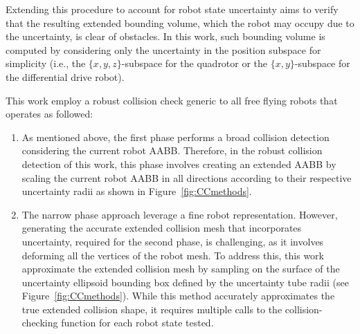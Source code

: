 Extending this procedure to account for robot state uncertainty aims to verify that the resulting extended bounding volume, which the robot may occupy due to the uncertainty, is clear of obstacles.
In this work, such bounding volume is computed by considering only the uncertainty in the position subspace for simplicity (i.e., the $\{x,y,z\}$-subspace for the quadrotor or the $\{x,y\}$-subspace for the differential drive robot).

This work employ a robust collision check generic to all free flying robots that operates as followed:
\begin{enumerate}
    \item As mentioned above, the first phase performs a broad collision detection considering the current robot AABB. 
    Therefore, in the robust collision detection of this work, this phase involves creating an extended AABB by scaling the current robot AABB in all directions according to their respective uncertainty radii as shown in Figure~\ref{fig:CCmethods}. 
    \item The narrow phase approach leverage a fine robot representation.
    However, generating the accurate extended collision mesh that incorporates uncertainty, required for the second phase, is challenging, as it involves deforming all the vertices of the robot mesh.
    To address this, this work approximate the extended collision mesh by sampling on the surface of the uncertainty ellipsoid bounding box defined by the uncertainty tube radii (see Figure~\ref{fig:CCmethods}). 
    While this method accurately approximates the true extended collision shape, it requires multiple calls to the collision-checking function for each robot state tested.
\end{enumerate}

